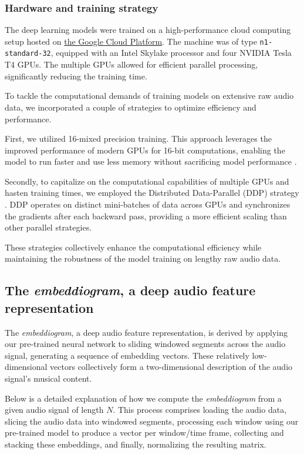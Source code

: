 \subsubsection{Hardware and training strategy}

The deep learning models were trained on a high-performance cloud computing setup hosted on \href{https://cloud.google.com/}{the Google Cloud Platform}. The machine was of type \texttt{n1-standard-32}, equipped with an Intel Skylake processor and four NVIDIA Tesla T4 GPUs. The multiple GPUs allowed for efficient parallel processing, significantly reducing the training time.

To tackle the computational demands of training models on extensive raw audio data, we incorporated a couple of strategies to optimize efficiency and performance. 

First, we utilized 16-mixed precision training. This approach leverages the improved performance of modern GPUs for 16-bit computations, enabling the model to run faster and use less memory without sacrificing model performance \cite{Das2018MixedOperations}.

Secondly, to capitalize on the computational capabilities of multiple GPUs and hasten training times, we employed the Distributed Data-Parallel (DDP) strategy \cite{Li2020PyTorchTraining}. DDP operates on distinct mini-batches of data across GPUs and synchronizes the gradients after each backward pass, providing a more efficient scaling than other parallel strategies. 

These strategies collectively enhance the computational efficiency while maintaining the robustness of the model training on lengthy raw audio data.

\subsection{The \textit{embeddiogram}, a deep audio feature representation}

The \textit{embeddiogram}, a deep audio feature representation, is derived by applying our pre-trained neural network to sliding windowed segments across the audio signal, generating a sequence of embedding vectors. These relatively low-dimensional vectors collectively form a two-dimensional description of the audio signal's musical content.

Below is a detailed explanation of how we compute the \textit{embeddiogram} from a given audio signal of length $N$. This process comprises loading the audio data, slicing the audio data into windowed segments, processing each window using our pre-trained model to produce a vector per window/time frame, collecting and stacking these embeddings, and finally, normalizing the resulting matrix. 

